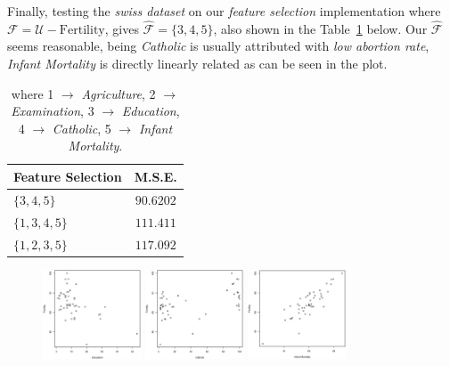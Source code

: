 \documentclass[a4paper, twocolumn]{article}
\begin{document}
    Finally, testing the \emph{swiss dataset} on our \emph{feature selection} implementation where $\mathcal{F} = \mathcal{U} - \mathrm{Fertility}$, gives $\hat{\mathcal{F}} = \{3, 4, 5\}$, also shown in the Table~\ref{table:featsel} below. Our $\hat{\mathcal{F}}$ seems reasonable, being \emph{Catholic} is usually attributed with \emph{low abortion rate}, \emph{Infant Mortality} is directly linearly related as can be seen in the plot.

    \begin{table}[h!]
    \begin{center}
    \begin{tabular}{lc}
        \toprule
            \textbf{Feature Selection} & \textbf{M.S.E.} \\
        \midrule
            $\{3, 4, 5\}$ & $90.6202$ \\
            $\{1, 3, 4, 5\}$ & $111.411$ \\
            $\{1, 2, 3, 5\}$ & $117.092$ \\
        \bottomrule
    \end{tabular}
    \end{center}
    \caption{where 1 $\rightarrow$ \emph{Agriculture}, 2 $\rightarrow$ \emph{Examination}, 3 $\rightarrow$ \emph{Education}, 4 $\rightarrow$ \emph{Catholic}, 5 $\rightarrow$ \emph{Infant Mortality}.}
    \label{table:featsel}
    \end{table}

    \begin{figure}[h!]
        \centering
        \includegraphics[width=0.26\textwidth]{share/education.eps}
        \includegraphics[width=0.26\textwidth]{share/catholic.eps}
        \includegraphics[width=0.26\textwidth]{share/mortality.eps}
    \end{figure}
\end{document}
